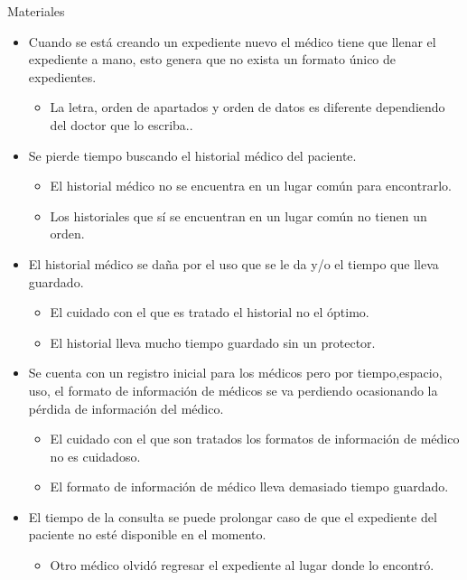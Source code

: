 Materiales 
\begin{itemize}
	\item Cuando se está creando un expediente nuevo el médico tiene que llenar el expediente a mano, esto genera que no exista un formato único de expedientes.
	\begin{itemize}
		\item La letra, orden de apartados y orden de datos es diferente dependiendo del doctor que lo escriba..
	\end{itemize}

    \item Se pierde tiempo buscando el historial médico del paciente.
	\begin{itemize}
		\item El historial médico no se encuentra en un lugar común para encontrarlo.
        \item Los historiales que sí se encuentran en un lugar común no tienen un orden.
	\end{itemize}
    
    
    \item El historial médico se daña por el uso que se le da y/o el tiempo que lleva guardado.
	\begin{itemize}
		\item El cuidado con el que es tratado el historial no el óptimo. 
		\item El historial lleva mucho tiempo guardado sin un protector.
	\end{itemize}
    
    
    \item Se cuenta con un registro inicial para los médicos pero por tiempo,espacio, uso, el formato de información de médicos se va perdiendo ocasionando la pérdida de información del médico.
	\begin{itemize}
		\item El cuidado con el que son tratados los formatos de información de médico no es cuidadoso.
        \item El formato de información de médico lleva demasiado tiempo guardado.
	\end{itemize}
    
    
    \item El tiempo de la consulta se puede prolongar caso de que el expediente del paciente no esté disponible en el momento.



	\begin{itemize}
		\item Otro médico olvidó regresar el expediente al lugar donde lo encontró.

	\end{itemize}
\end{itemize}
